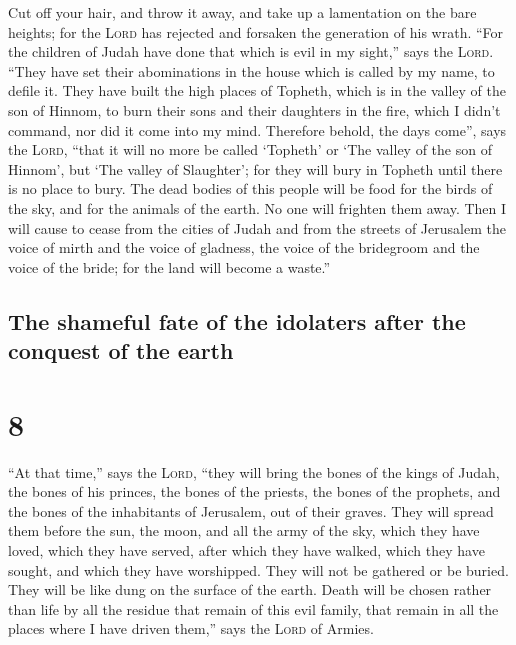  Cut off your hair, and throw it away, and take up a
lamentation on the bare heights; for the \textsc{Lord} has rejected and
forsaken the generation of his wrath.  ``For the children
of Judah have done that which is evil in my sight,'' says the
\textsc{Lord}. ``They have set their abominations in the house which is
called by my name, to defile it.  They have built the
high places of Topheth, which is in the valley of the son of Hinnom, to
burn their sons and their daughters in the fire, which I didn't command,
nor did it come into my mind.  Therefore behold, the days
come'', says the \textsc{Lord}, ``that it will no more be called
`Topheth' or `The valley of the son of Hinnom', but `The valley of
Slaughter'; for they will bury in Topheth until there is no place to
bury.  The dead bodies of this people will be food for
the birds of the sky, and for the animals of the earth. No one will
frighten them away.  Then I will cause to cease from the
cities of Judah and from the streets of Jerusalem the voice of mirth and
the voice of gladness, the voice of the bridegroom and the voice of the
bride; for the land will become a waste.''

\hypertarget{the-shameful-fate-of-the-idolaters-after-the-conquest-of-the-earth}{%
\subsection{The shameful fate of the idolaters after the conquest of the
earth}\label{the-shameful-fate-of-the-idolaters-after-the-conquest-of-the-earth}}

\hypertarget{section-7}{%
\section{8}\label{section-7}}

 ``At that time,'' says the \textsc{Lord}, ``they will
bring the bones of the kings of Judah, the bones of his princes, the
bones of the priests, the bones of the prophets, and the bones of the
inhabitants of Jerusalem, out of their graves.  They will
spread them before the sun, the moon, and all the army of the sky, which
they have loved, which they have served, after which they have walked,
which they have sought, and which they have worshipped. They will not be
gathered or be buried. They will be like dung on the surface of the
earth.  Death will be chosen rather than life by all the
residue that remain of this evil family, that remain in all the places
where I have driven them,'' says the \textsc{Lord} of Armies.

